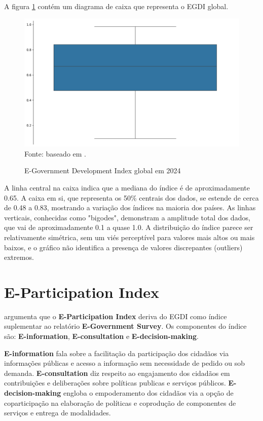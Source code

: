 A figura \ref{fig:boxplot_egov_global} contém um diagrama de caixa que representa o EGDI global.

\begin{figure}[H]
	\centering
	\caption{E-Government Development Index global em 2024}
	\includegraphics[width=1\linewidth]{figuras/egdi/boxplot_egov_global.png}
	\label{fig:boxplot_egov_global}
	\footnotesize{Fonte: baseado em \cite{ONU_EGDI_mapa}.}
\end{figure}

A linha central na caixa indica que a mediana do índice é de aproximadamente 0.65. A caixa em si, que representa os 50\% centrais dos dados, se estende de cerca de 0.48 a 0.83, mostrando a variação dos índices na maioria dos países. As linhas verticais, conhecidas como "bigodes", demonstram a amplitude total dos dados, que vai de aproximadamente 0.1 a quase 1.0. A distribuição do índice parece ser relativamente simétrica, sem um viés perceptível para valores mais altos ou mais baixos, e o gráfico não identifica a presença de valores discrepantes (outliers) extremos.

\section{E-Participation Index}
\label{epart}

\cite{ONU_EGDI} argumenta que o \textbf{E-Participation Index} deriva do EGDI como índice suplementar ao relatório \textbf{E-Government Survey}. Os componentes do índice são: \textbf{E-information}, \textbf{E-consultation} e \textbf{E-decision-making}. 

\textbf{E-information} fala sobre a facilitação da participação dos cidadãos via informações públicas e acesso a informação sem necessidade de pedido ou sob demanda. \textbf{E-consultation} diz respeito ao engajamento dos cidadãos em contribuições e deliberações sobre políticas publicas e serviços públicos. \textbf{E-decision-making} engloba o empoderamento dos cidadãos via a opção de coparticipação na elaboração de políticas e coprodução de componentes de serviços e entrega de modalidades.

